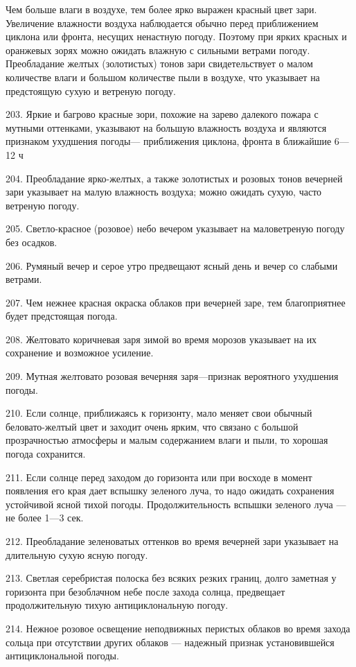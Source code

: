 Чем больше влаги в воздухе, тем более ярко выражен красный цвет зари. Увеличение влажности воздуха наблюдается обычно перед приближением циклона или фронта, несущих ненастную погоду. Поэтому при ярких красных и оранжевых зорях можно ожидать влажную с сильными ветрами погоду. Преобладание желтых (золотистых) тонов зари свидетельствует о малом количестве влаги и большом количестве пыли в воздухе, что указывает на предстоящую сухую и ветреную погоду.

203. Яркие и багрово красные зори, похожие на зарево далекого пожара с мутными оттенками, указывают на большую влажность воздуха и являются признаком ухудшения погоды— приближения циклона, фронта в ближайшие 6—12 ч

204. Преобладание ярко-желтых, а также золотистых и розовых тонов вечерней зари указывает на малую влажность воздуха; можно ожидать сухую, часто ветреную погоду.

205. Светло-красное (розовое) небо вечером указывает на маловетреную погоду без осадков.

206. Румяный вечер и серое утро предвещают ясный день и вечер со слабыми ветрами.

207. Чем нежнее красная окраска облаков при вечерней заре, тем благоприятнее будет предстоящая погода.

208. Желтовато коричневая заря зимой во время морозов указывает на их сохранение и возможное усиление.

209. Мутная желтовато розовая вечерняя заря—признак вероятного ухудшения погоды.

210. Если солнце, приближаясь к горизонту, мало меняет свои обычный беловато-желтый цвет и заходит очень ярким, что связано с большой прозрачностью атмосферы и малым содержанием влаги и пыли, то хорошая погода сохранится.

211. Если солнце перед заходом до горизонта или при восходе в момент появления его края дает вспышку зеленого луча, то надо ожидать сохранения устойчивой ясной тихой погоды. Продолжительность вспышки зеленого луча — не более 1—3 сек.

212. Преобладание зеленоватых оттенков во время вечерней зари указывает на длительную сухую ясную погоду.

213. Светлая серебристая полоска без всяких резких границ, долго заметная у горизонта при безоблачном небе после захода солнца, предвещает продолжительную тихую антициклональную погоду.

214. Нежное розовое освещение неподвижных перистых облаков во время захода сольца при отсутствии других облаков — надежный признак установившейся антициклональной погоды.

